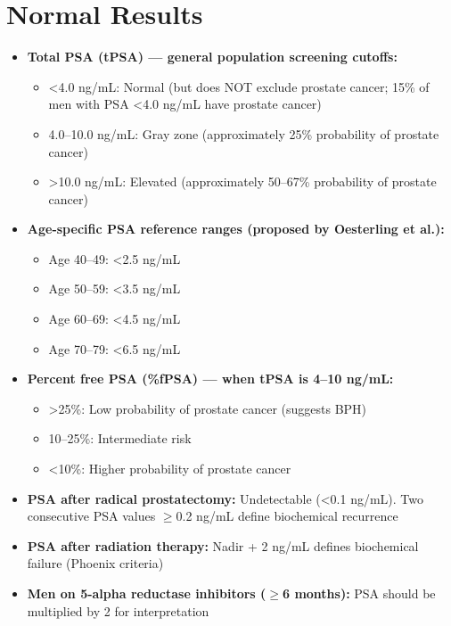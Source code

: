 \section*{Normal Results}
\begin{itemize}
  \item \textbf{Total PSA (tPSA) --- general population screening cutoffs:}
  \begin{itemize}
    \item <4.0 ng/mL: Normal (but does NOT exclude prostate cancer; 15\% of men with PSA <4.0 ng/mL have prostate cancer)
    \item 4.0--10.0 ng/mL: Gray zone (approximately 25\% probability of prostate cancer)
    \item >10.0 ng/mL: Elevated (approximately 50--67\% probability of prostate cancer)
  \end{itemize}
  \item \textbf{Age-specific PSA reference ranges (proposed by Oesterling et al.):}
  \begin{itemize}
    \item Age 40--49: <2.5 ng/mL
    \item Age 50--59: <3.5 ng/mL
    \item Age 60--69: <4.5 ng/mL
    \item Age 70--79: <6.5 ng/mL
  \end{itemize}
  \item \textbf{Percent free PSA (\%fPSA) --- when tPSA is 4--10 ng/mL:}
  \begin{itemize}
    \item >25\%: Low probability of prostate cancer (suggests BPH)
    \item 10--25\%: Intermediate risk
    \item <10\%: Higher probability of prostate cancer
  \end{itemize}
  \item \textbf{PSA after radical prostatectomy:} Undetectable (<0.1 ng/mL). Two consecutive PSA values $\geq$0.2 ng/mL define biochemical recurrence
  \item \textbf{PSA after radiation therapy:} Nadir + 2 ng/mL defines biochemical failure (Phoenix criteria)
  \item \textbf{Men on 5-alpha reductase inhibitors ($\geq$6 months):} PSA should be multiplied by 2 for interpretation
\end{itemize}

